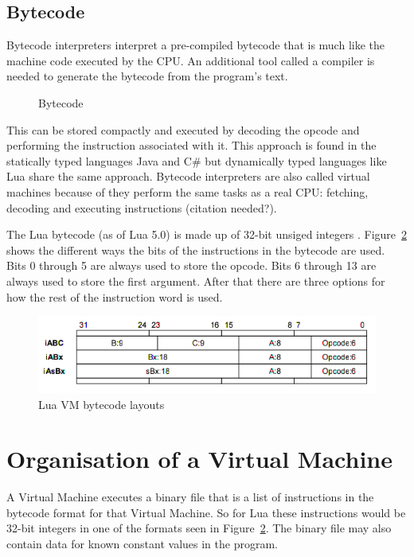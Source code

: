\documentclass[english,a4paper]{report}
\begin{document}
\subsection{Bytecode}
Bytecode interpreters interpret a pre-compiled bytecode that is much
like the machine code executed by the CPU. An additional tool called a
compiler is needed to generate the bytecode from the program's text.

\begin{figure}
  \centering
  
  \caption{Bytecode}
  \label{fig:byte}
\end{figure}

This can be stored compactly and executed by decoding the opcode and
performing the instruction associated with it. This approach is found
in the statically typed languages Java and C\# but dynamically typed
languages like Lua share the same approach. Bytecode interpreters are
also called virtual machines because of they perform the same tasks as
a real CPU: fetching, decoding and executing instructions (citation
needed?).

The Lua bytecode (as of Lua 5.0) is made up of 32-bit unsiged integers
\cite{RobertoIerusalimschy}. Figure~\ref{fig:luabyte} shows the
different ways the bits of the instructions in the bytecode are
used. Bits 0 through 5 are always used to store the opcode. Bits 6
through 13 are always used to store the first argument. After that
there are three options for how the rest of the instruction word is
used.

\begin{figure}
  \includegraphics[width=\linewidth]{luabytecode.png}
  \caption{Lua VM bytecode layouts
    \protect\cite{RobertoIerusalimschy}}
  \label{fig:luabyte}
\end{figure}

\section{Organisation of a Virtual Machine} 
A Virtual Machine executes a binary file that is a list of
instructions in the bytecode format for that Virtual Machine. So for
Lua these instructions would be 32-bit integers in one of the formats
seen in Figure~\ref{fig:luabyte}. The binary file may also contain
data for known constant values in the program.
\end{document}
